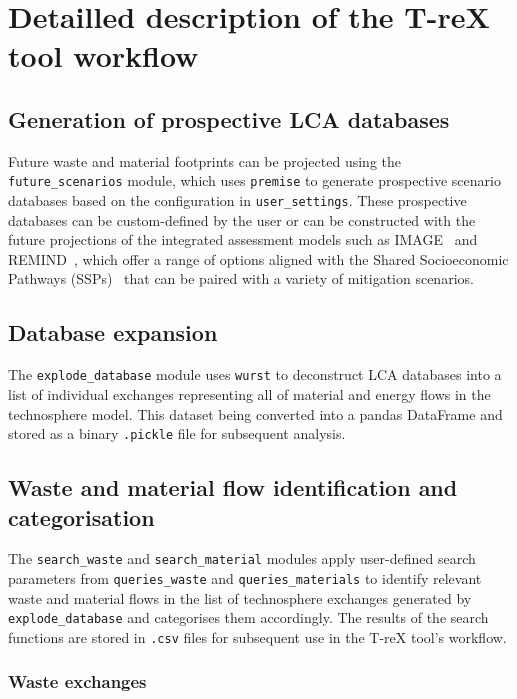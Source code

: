 \documentclass{article}
\renewcommand{\texttt}[1]{{\ttfamily\small\nolinkurl{#1}}}
\begin{document}
\section{Detailled description of the T-reX tool workflow}


\subsection{Generation of prospective LCA databases}

Future waste and material footprints can be projected using the \texttt{future\_scenarios} module, which uses \texttt{premise} to generate prospective scenario databases based on the configuration in \texttt{user\_settings}. These prospective databases can be custom-defined by the user or can be constructed with the future projections of the integrated assessment models such as IMAGE~\citep{stehfest2014image} and REMIND~\citep{remind2020model}, which offer a range of options aligned with the Shared Socioeconomic Pathways (SSPs)~\citep{ssp2020ghg} that can be paired with a variety of mitigation scenarios.

\subsection{Database expansion}
The \texttt{explode\_database} module uses \texttt{wurst} to deconstruct LCA databases into a list of individual exchanges representing all of material and energy flows in the technosphere model. This dataset being converted into a pandas DataFrame and stored as a binary \texttt{.pickle} file for subsequent analysis.

\subsection{Waste and material flow identification and categorisation}

The \texttt{search\_waste} and \texttt{search\_material} modules apply user-defined search parameters from \texttt{queries\_waste} and \texttt{queries\_materials} to identify relevant waste and material flows in the list of technosphere exchanges generated by \texttt{explode\_database} and categorises them accordingly. The results of the search functions are stored in \texttt{.csv} files for subsequent use in the T-reX tool's workflow.

\subsubsection{Waste exchanges}\label{sec:method-T-reX-waste_exchanges}
\end{document}
